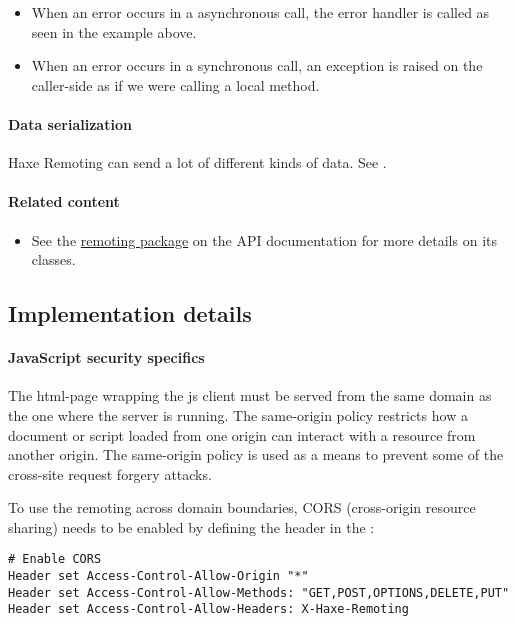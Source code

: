 \begin{itemize}
	\item When an error occurs in a asynchronous call, the error handler is called as seen in the example above.
	\item When an error occurs in a synchronous call, an exception is raised on the caller-side as if we were calling a local method.
\end{itemize}

\paragraph{Data serialization}

Haxe Remoting can send a lot of different kinds of data. See .


\paragraph{Related content}
\begin{itemize}
	\item See the \href{https://api.haxe.org/haxe/remoting/}{remoting package} on the API documentation for more details on its classes.
\end{itemize}

\subsection{Implementation details}
\label{std-remoting-implementation-details}

\paragraph{JavaScript security specifics}

The html-page wrapping the js client must be served from the same domain as the one where the server is running. The same-origin policy restricts how a document or script loaded from one origin can interact with a resource from another origin. The same-origin policy is used as a means to prevent some of the cross-site request forgery attacks.

To use the remoting across domain boundaries, CORS (cross-origin resource sharing) needs to be enabled by defining the header  in the :

\begin{lstlisting}
# Enable CORS
Header set Access-Control-Allow-Origin "*"
Header set Access-Control-Allow-Methods: "GET,POST,OPTIONS,DELETE,PUT"
Header set Access-Control-Allow-Headers: X-Haxe-Remoting
\end{lstlisting} 

